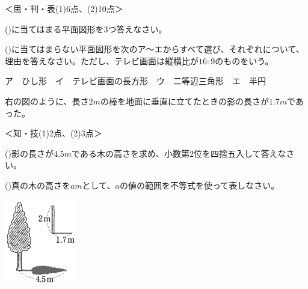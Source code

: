 \documentclass[
  12pt,a4paper,lualatex,ja=standard]{bxjsarticle}
\begin{document}
\begin{flushleft}
%
\begin{flushright}%
\footnotesize{＜思・判・表(1)6点、(2)10点＞}%
\end{flushright}%


()\hspace{2.5pt}に当てはまる平面図形を3つ答えなさい。

()\hspace{2.5pt}に当てはまらない平面図形を次のア〜エからすべて選び、それぞれについて、理由を答えなさい。ただし、テレビ画面は縦横比が$16:9$のものをいう。

ア　ひし形　イ　テレビ画面の長方形　ウ　二等辺三角形　エ　半円

\vfill

\newpage

\setcounter{skaunta}{0}

\begin{multicols}{2}

\noindent{} \hspace{1pt}右の図のように、長さ$2\si{m}$の棒を地面に垂直に立てたときの影の長さが$1.7\si{m}$であった。

%
\begin{flushright}%
\footnotesize{＜知・技(1)2点、(2)3点＞}%
\end{flushright}%


()\hspace{2.5pt}影の長さが$4.5\si{m}$である木の高さを求め、小数第2位を四捨五入して答えなさい。

\vspace{15mm}

()\hspace{2.5pt}真の木の高さを$a\si{m}$として、$a$の値の範囲を不等式を使って表しなさい。



\columnbreak

\begin{center}
\def\@captype{figure}
\includegraphics[height=10em]{height_wood.jpg}


\end{center}
\end{multicols}
\end{flushleft}
\end{document}
